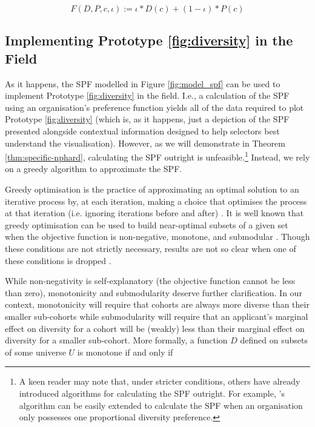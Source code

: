 \begin{equation}\label{eq:f_spec}
F(D, P, c, \iota) := \iota*D(c)+(1-\iota)*P(c)
\end{equation}

\subsection{Implementing Prototype \ref{fig:diversity} in the Field}\label{sec:spf_alg}
As it happens, the SPF modelled in Figure \ref{fig:model_spf} can be used to implement Prototype \ref{fig:diversity} in the field. I.e., a calculation of the SPF using an organisation's preference function yields all of the data required to plot Prototype \ref{fig:diversity} (which is, as it happens, just a depiction of the SPF presented alongside contextual information designed to help selectors best understand the visualisation). However, as we will demonstrate in Theorem \ref{thm:specific-nphard}, calculating the SPF outright is unfeasible.\footnote{A keen reader may note that, under stricter conditions, others have already introduced algorithms for calculating the SPF outright. For example, \textcite{kleinberg2018algorithmic}'s algorithm can be easily extended to calculate the SPF when an organisation only possesses one proportional diversity preference.} Instead, we rely on a greedy algorithm to approximate the SPF.

Greedy optimisation is the practice of approximating an optimal solution to an iterative process by, at each iteration, making a choice that optimises the process at that iteration (i.e. ignoring iterations before and after) \cite{nemhauser1978analysis}. It is well known that greedy optimisation can be used to build near-optimal subsets of a given set when the objective function is non-negative, monotone, and submodular \cite{Feldman_Harshaw_Karbasi_2017,nemhauser1978analysis}. Though these conditions are not strictly necessary, results are not so clear when one of these conditions is dropped \cite{Feldman_Harshaw_Karbasi_2017}.

While non-negativity is self-explanatory (the objective function cannot be less than zero), monotonicity and submodularity deserve further clarification. In our context, monotonicity will require that cohorts are always more diverse than their smaller sub-cohorts while submodularity will require that an applicant's marginal effect on diversity for a cohort will be (weakly) less than their marginal effect on diversity for a smaller sub-cohort. More formally, a function $D$ defined on subsets of some universe $U$ is monotone if and only if 

